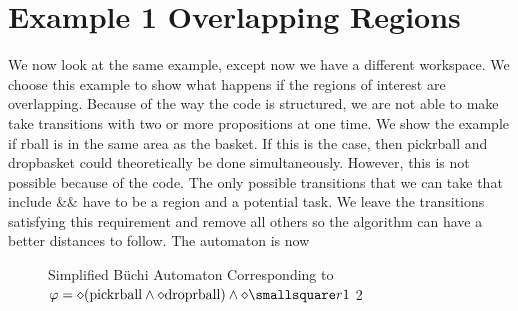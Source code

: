 \section{Example 1 Overlapping Regions}
We now look at the same example, except now we have a different workspace. We choose this example to show what happens if the regions of interest are overlapping. Because of the way the code is structured, we are not able to make take transitions with two or more propositions at one time. We show the example if rball is in the same area as the basket. If this is the case, then pickrball and dropbasket could theoretically be done simultaneously. However, this is not possible because of the code. The only possible transitions that we can take that include \&\& have to be a region and a potential task. We leave the transitions satisfying this requirement and remove all others so the algorithm can have a better distances to follow. The automaton is now
\begin{figure}
\centering
{}
\caption{Simplified B\"uchi Automaton Corresponding to $\varphi = \diamond (\text{pickrball} \wedge \diamond \text{droprball}) \wedge \diamond \smallsquare r1$ 2}
\label{fig:ex1OverlapSimplifiedBuchi}
\end{figure} 

